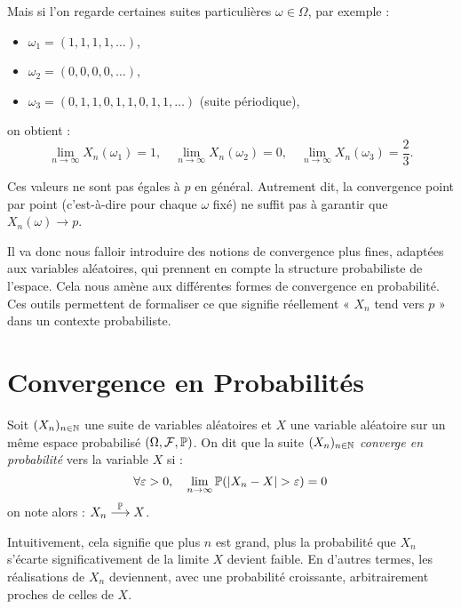 Mais si l'on regarde certaines suites particulières $\omega \in \Omega$, par exemple :
\begin{itemize}
    \item $\omega_1 = (1,1,1,1,\dots)$,
    \item $\omega_2 = (0,0,0,0,\dots)$,
    \item $\omega_3 = (0,1,1,0,1,1,0,1,1,\dots)$ (suite périodique),
\end{itemize}

on obtient :
\[
    \lim_{n \to \infty} X_n(\omega_1) = 1, \quad 
    \lim_{n \to \infty} X_n(\omega_2) = 0, \quad 
    \lim_{n \to \infty} X_n(\omega_3) = \frac{2}{3}.
\]

Ces valeurs ne sont pas égales à $p$ en général.
Autrement dit, la convergence point par point (c’est-à-dire pour chaque $\omega$ fixé) ne suffit pas à garantir que $X_n(\omega) \to p$.

\vspace{0.3cm}

Il va donc nous falloir introduire des notions de convergence plus fines, adaptées aux variables aléatoires, 
qui prennent en compte la structure probabiliste de l’espace. Cela nous amène aux différentes formes de 
convergence en probabilité. Ces outils permettent de formaliser ce que signifie réellement « $X_n$ tend 
vers $p$ » dans un contexte probabiliste.


\section{Convergence en Probabilités}

\begin{definition}
    Soit $(X_n)_{n \in \mathbb{N}}$ une suite de variables aléatoires et $X$ une variable aléatoire sur un 
    même espace probabilisé $(\Omega, \mathcal{F}, \mathbb{P})$. On dit que la suite $(X_n)_{n \in \mathbb{N}}$ 
    \emph{converge en probabilité} vers la variable $X$ si : 
        \[ \forall \varepsilon > 0, \quad \lim_{n\to\infty} \mathbb{P}(|X_n - X| > \varepsilon) = 0 \] 
    on note alors : $ X_n \overset{\mathbb{P}}{\longrightarrow} X$. 
\end{definition}

Intuitivement, cela signifie que plus $n$ est grand, plus la probabilité que $X_n$ s'écarte significativement 
de la limite $X$ devient faible. En d'autres termes, les réalisations de $X_n$ deviennent, avec une 
probabilité croissante, arbitrairement proches de celles de $X$.

